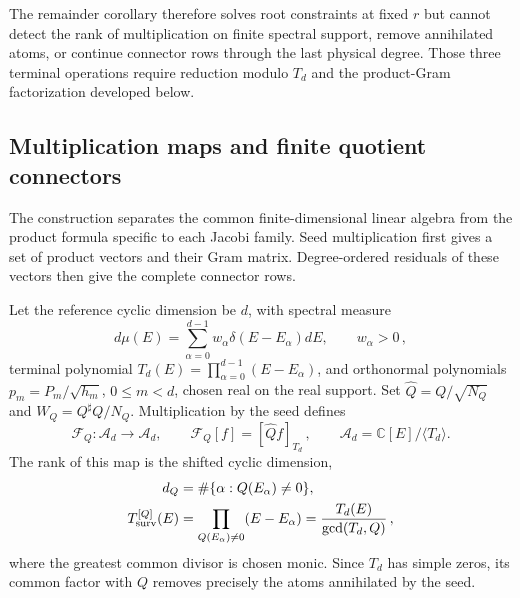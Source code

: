 \documentclass[a4paper,11pt]{article}
\def\dd{d}%
\theoremstyle{definition}
\theoremstyle{remark}
\newcommand{\dd}{\mathrm d}
\newcommand{\CC}{\mathbb C}
\newcommand{\cA}{\mathcal A}
\newcommand{\cF}{\mathcal F}
\newcommand{\Qhat}{\widehat Q}
\newcommand{\Qsh}{Q^{\sharp}}
\begin{document}
The remainder corollary therefore solves root constraints at fixed $r$ but cannot detect the
rank of multiplication on finite spectral support, remove annihilated atoms, or continue connector
rows through the last physical degree.  Those three terminal operations require reduction modulo
$T_d$ and the product-Gram factorization developed below.

\subsection{Multiplication maps and finite quotient connectors}
\label{app:finite-multiplication-gram}

The construction separates the common finite-dimensional linear algebra
from the product formula specific to each Jacobi family.  Seed multiplication
first gives a set of product vectors and their Gram matrix.
Degree-ordered residuals of these vectors then give the complete
connector rows.

Let the reference cyclic dimension be $d$, with spectral measure
\begin{equation}
   \dd\mu(E)=\sum_{\alpha=0}^{d-1}
   w_\alpha\delta(E-E_\alpha)\dd E,
   \qquad w_\alpha>0\,,
\end{equation}
terminal polynomial
$T_d(E)=\prod_{\alpha=0}^{d-1}(E-E_\alpha)$, and orthonormal
polynomials $p_m=P_m/\sqrt{h_m}$, $0\le m<d$, chosen real on the real
support.  Set $\Qhat=Q/\sqrt{N_Q}$ and
$W_Q=\Qsh Q/N_Q$.  Multiplication by the seed defines
\begin{equation}
   \cF_Q:\cA_d\longrightarrow\cA_d,
   \qquad
   \cF_Q[f]=[\Qhat f]_{T_d}\,,
   \qquad
   \cA_d=\CC[E]/\langle T_d\rangle.
   \label{eq:finite-product-map-app}
\end{equation}
The rank of this map is the shifted cyclic dimension,
\begin{equation}
\begin{aligned}
   d_Q&=\#\{\alpha:Q(E_\alpha)\ne0\},\\
   T_{\rm surv}^{[Q]}(E)
   &=\prod_{Q(E_\alpha)\ne0}(E-E_\alpha)
   =\frac{T_d(E)}{\gcd(T_d,Q)}\,,
\end{aligned}
   \label{eq:finite-product-surviving-polynomial-app}
\end{equation}
where the greatest common divisor is chosen monic.  Since $T_d$ has
simple zeros, its common factor with $Q$ removes precisely the atoms
annihilated by the seed.
\end{document}
